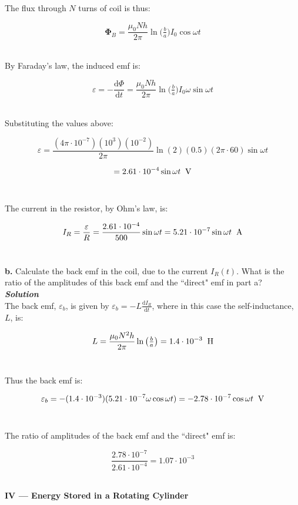 \documentclass[14pt]{extarticle}
\renewcommand{\v}[1]{{\bm #1}}
\newcommand{\bfit}[1]{\textbf{\textit{#1}}}
\renewcommand{\d}{\text{d}}
\newcommand{\ddt}[1]{\frac{\d #1}{\d t}}
\newcommand{\muo}{\mu_0}
\begin{document}
The flux through $N$ turns of coil is thus:

$$\v \Phi_B = \frac{\muo Nh}{2\pi} \ln \big( \tfrac ba \big) I_0 \cos\omega t$$ \

By Faraday's law, the induced emf is:

$$\varepsilon = -\ddt \Phi = \frac{\muo Nh}{2\pi} \ln \big( \tfrac ba \big) I_0 \omega\sin\omega t$$ \

Substituting the values above:

$$\varepsilon = \frac{(4\pi \cdot 10^{-7})(10^3)(10^{-2})}{2\pi} \ln(2) (0.5) (2\pi \cdot 60) \sin\omega t$$

$$= 2.61 \cdot 10^{-4} \sin\omega t \;\; \text V$$ \ 

The current in the resistor, by Ohm's law, is:

$$I_R = \frac \varepsilon R = \frac{2.61 \cdot 10^{-4}}{500}\sin\omega t =  5.21 \cdot 10^{-7} \sin\omega t\;\; \text A$$ \  




\dotfill 

\hfill 

{\Large \bf b.} Calculate the back emf in the coil, due to the current $I_R(t)$. What is the ratio of the amplitudes of this back emf and the ``direct" emf in part a? \\ 

{\bfit{Solution}} \\ 

The back emf, $\varepsilon_b$, is given by $\varepsilon_b = -L \ddt{I_R}$, where in this case the self-inductance, $L$, is:

$$L = \frac{\muo N^2 h}{2\pi} \ln \big( \tfrac ba \big) = 1.4 \cdot 10^{-3} \;\; \text H$$ \ 

Thus the back emf is:

$$\varepsilon_b = -(1.4 \cdot 10^{-3}) (5.21 \cdot 10^{-7} \omega\cos\omega t) = -2.78 \cdot 10^{-7}\cos\omega t\;\; \text V$$ \ 

The ratio of amplitudes of the back emf and the ``direct" emf is:

$$\frac{2.78 \cdot 10^{-7}}{2.61 \cdot 10^{-4}} = 1.07  \cdot 10^{-3}$$ \







\hrulefill 

\hfill 

{\LARGE \bf IV --- Energy Stored in a Rotating Cylinder} \\ 
\end{document}
